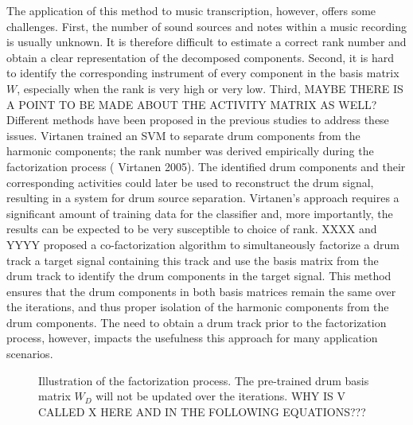 \documentclass{article}
\begin{document}
The application of this method to music transcription, however, offers some challenges. 
First, the number of sound sources and notes within a music recording is usually unknown. It is therefore difficult to estimate a correct rank number and obtain a clear representation of the decomposed  components. 
Second, it is hard to identify the corresponding instrument of every component in the basis matrix $W$, especially when the rank is very high or very low. 
Third, MAYBE THERE IS A POINT TO BE MADE ABOUT THE ACTIVITY MATRIX AS WELL?
Different methods have been proposed in the previous studies to address these issues. Virtanen trained an SVM to separate drum components from the harmonic components; the rank number was derived empirically during the factorization process (\cite{} Virtanen 2005). The identified drum components and their corresponding activities could later be used to reconstruct the drum signal, resulting in a system for drum source separation. Virtanen's approach requires a significant amount of training data for the classifier and, more importantly, the results can be expected to be very susceptible to choice of rank. %
XXXX and YYYY proposed a co-factorization algorithm to simultaneously factorize a drum track a target signal containing this track and use the basis matrix from the drum track to identify the drum components in the target signal. This method ensures that the drum components in both basis matrices remain the same over the iterations, and thus proper isolation of the harmonic components from the drum components. The need to obtain a drum track prior to the factorization process, however, impacts the usefulness this approach for many application scenarios.

\begin{figure}
 \centerline{}
 \caption{Illustration of the factorization process. The pre-trained drum basis matrix $W_D$ will not be updated over the iterations. WHY IS V CALLED X HERE AND IN THE FOLLOWING EQUATIONS??? }
 \label{fig:factorization}
\end{figure}
\end{document}
